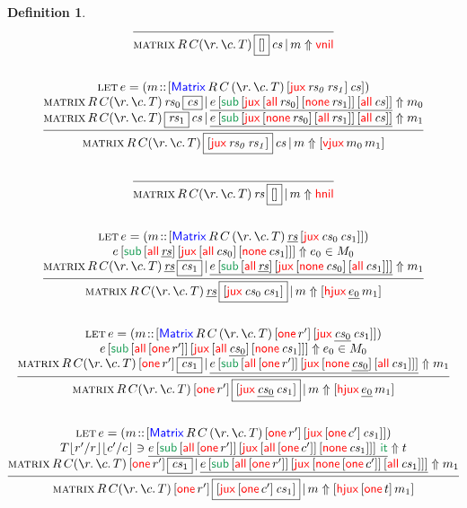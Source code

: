 \documentclass[12pt, a4paper]{article}
\makeatletter
\newcommand{\bsl}{\texttt{\symbol{92}}}
\newcommand{\Nil}{\mathbf{[]}}
\newcommand{\sub}{\mathsf{sub}}
\newcommand{\itAtom}{\mathsf{it}}
\newcommand{\gp}{\,}
\newcommand{\forms}[3]{
  \ifthenelse{\equal{{#2}}{}}
  {\textcolor{#3}{\gp {#1}}}
  {[\textcolor{#3}{#1}\gp {#2}]}
}
\newcommand{\elim}[2]{\forms{#1}{#2}{ForestGreen}}
\newcommand{\elimOne}[1]{\gp \textcolor{ForestGreen}{#1}}
\newcommand{\subst}[2]{{#1}\lfloor {#2} \rfloor}
\newcommand{\substfor}[3]{\subst{#1}{ {#2} / {#3} }}
\newcommand{\C}[1]{\textcolor{red}{\mathsf{#1}}}
\newcommand{\D}[1]{\textcolor{blue}{\mathsf{#1}}}
\newcommand{\one}[1]{[ \C{one} \gp  {#1} ]}
\newcommand{\Matrix}[7]{[ \D{Matrix} \gp {#1} \gp {#2} \gp ( \la{#3}\la{#4} {#5}) \gp {#6} \gp {#7}]}
\newcommand{\vnil}{\single{\C{vnil}}}
\newcommand{\hnil}{\single{\C{hnil}}}
\newcommand{\jux}[2]{[ \C{jux} \gp {#1} \gp {#2}]}
\newcommand{\hjux}[2]{[ \C{hjux} \gp {#1} \gp {#2}]}
\newcommand{\vjux}[2]{[ \C{vjux} \gp {#1} \gp {#2}]}
\newcommand{\thAll}[1]{[ \C{all} \gp {#1}]}
\newcommand{\thNone}[1]{[ \C{none} \gp {#1}]}
\newcommand{\thJux}[2]{[ \C{jux} \gp {#1} \gp {#2}]}
\newcommand{\subElim}[3]{{#1} \gp \elim{\sub}{{#2} \gp {#3}}}
\newcommand{\itElim}[1]{{#1} \gp \elimOne{\itAtom}}
\newcommand{\rad}[2]{({#1} \!::\! {#2})}
\newcommand{\neu}[1]{\underline{#1}}
\newcommand{\la}[1]{\bsl{#1}.\,}
\newcommand{\V}[1]{\mathit{#1}}
\newcommand{\single}[1]{#1}
\newcommand{\etaexp}{\Uparrow}
\newcommand{\chkexp}[3]{{#1} \ni {#2} \etaexp {#3}}
\newcommand{\synexp}[3]{{#1} \etaexp {#2} \in {#3}}
\newcommand{\rowjudg}[4]{\textsc{matrix} \gp R \gp C (\la{r}\la{c} {T}) \gp
    \fbox{\ensuremath{#1}} \gp {#2} \gp | \gp {#3}  \etaexp {#4}}
\newcommand{\coljudg}[4]{\textsc{matrix} \gp R \gp C (\la{r}\la{c} {T}) \gp
  {#1} \gp \fbox{\ensuremath{#2}} \gp | \gp {#3}  \etaexp {#4}}
\newcommand{\letbind}[2]{\textsc{let} \gp {#1} = {#2}}
\newtheorem{dfn}{Definition}
\newcommand{\stackprem}[1]{
  \begin{array}[b]{@{}c@{}}
  #1
  \end{array}
}
\makeatother
\begin{document}
\begin{dfn}
  \begin{gather*}
    \infer{\rowjudg{\Nil}{\V{cs}}{m}{\vnil}}{}\\ \\
    \infer{\rowjudg{\jux{\V{rs_{0}}}{\V{rs_{1}}}}{\V{cs}}{m}{\vjux{m_{0}}{m_{1}}}}
    {\stackprem{\letbind{e}{\rad{m}{\Matrix{R}{C}{r}{c}{T}{\jux{\V{rs_{0}}}{\V{rs_{1}}}}{\V{cs}}}} \\
     \coljudg{\V{rs}_{0}}{\V{cs}}{
        \neu{\subElim{e}{\thJux{\thAll{\V{rs}_{0}}}{\thNone{\V{rs}_{1}}}}{\thAll{\V{cs}}}}}{m_{0}} \\
     \rowjudg{\V{rs}_{1}}{\V{cs}}{
        \neu{\subElim{e}{\thJux{\thNone{\V{rs}_{0}}}{\thAll{\V{rs}_{1}}}}{\thAll{\V{cs}}}}}{m_{1}}}
  }\\ \\
  \infer{\coljudg{\V{rs}}{\Nil}{m}{\hnil}}{}\\ \\
  \infer{\coljudg{\neu{\V{rs}}}{\jux{\V{cs}_{0}}{\V{cs}_{1}}}{m}{\hjux{\neu{e_{0}}}{m_{1}}}}
  {\stackprem{\letbind{e}{\rad{m}{\Matrix{R}{C}{r}{c}{T}{\neu{\V{rs}}}{\jux{\V{cs}_{0}}{\V{cs}_{1}}}}} \\
   \synexp{\subElim{e}{\thAll{\neu{\V{rs}}}}{\thJux{\thAll{\V{cs}_{0}}}{\thNone{\V{cs}_{1}}}}}{e_{0}}{M_{0}} \\
   \coljudg{\neu{\V{rs}}}{\V{cs}_{1}}{\neu{\subElim{e}{\thAll{\neu{\V{rs}}}}{\thJux{\thNone{\V{cs}_{0}}}{\thAll{\V{cs}_{1}}}}}}{m_{1}}
  }
  }\\ \\
  \infer{\coljudg{\one{r'}}{\jux{\neu{\V{cs}_{0}}}{\V{cs}_{1}}}{m}{\hjux{\neu{e_{0}}}{m_{1}}}}
  {\stackprem{\letbind{e}{\rad{m}{\Matrix{R}{C}{r}{c}{T}{\one{r'}}{\jux{\neu{\V{cs}_{0}}}{\V{cs}_{1}}}}} \\
   \synexp{\subElim{e}{\thAll{\one{r'}}}{\thJux{\thAll{\neu{\V{cs}_{0}}}}{\thNone{\V{cs}_{1}}}}}{e_{0}}{M_{0}} \\
  \coljudg{\one{r'}}{\V{cs}_{1}}{\neu{\subElim{e}{\thAll{\one{r'}}}{\thJux{\thNone{\neu{\V{cs}_{0}}}}{\thAll{\V{cs}_{1}}}}}}{m_{1}}
    }
  }\\ \\
  \infer{\coljudg{\one{r'}}{\jux{\one{c'}}{\V{cs}_{1}}}{m}{\hjux{\one{t}}{m_{1}}}}
  {\stackprem{\letbind{e}{\rad{m}{\Matrix{R}{C}{r}{c}{T}{\one{r'}}{\jux{\one{c'}}{\V{cs}_{1}}}}} \\
   \chkexp{\substfor{\substfor{T}{r'}{r}}{c'}{c}}
      {\neu{\itElim{\subElim{e}{\thAll{\one{r'}}}{\thJux{\thAll{\one{c'}}}{\thNone{\V{cs}_{1}}}}}}}{t} \\
   \coljudg{\one{r'}}{\V{cs}_{1}}{\neu{\subElim{e}{\thAll{\one{r'}}}{\thJux{\thNone{\one{c'}}}{\thAll{\V{cs}_{1}}}}}}{m_{1}}
    }
  }
  \end{gather*}
\end{dfn}
\end{document}
